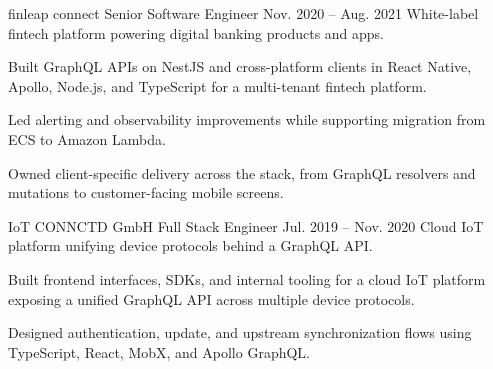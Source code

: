\ResumeJob
  {finleap connect}
  {Senior Software Engineer}
  {Nov. 2020 -- Aug. 2021}
  {White-label fintech platform powering digital banking products and apps.}
\begin{ResumeList}
  \item Built GraphQL APIs on NestJS and cross-platform clients in React Native, Apollo, Node.js, and TypeScript for a multi-tenant fintech platform.
  \item Led alerting and observability improvements while supporting migration from ECS to Amazon Lambda.
  \item Owned client-specific delivery across the stack, from GraphQL resolvers and mutations to customer-facing mobile screens.
\end{ResumeList}

\ResumeJob
  {IoT CONNCTD GmbH}
  {Full Stack Engineer}
  {Jul. 2019 -- Nov. 2020}
  {Cloud IoT platform unifying device protocols behind a GraphQL API.}
\begin{ResumeList}
  \item Built frontend interfaces, SDKs, and internal tooling for a cloud IoT platform exposing a unified GraphQL API across multiple device protocols.
  \item Designed authentication, update, and upstream synchronization flows using TypeScript, React, MobX, and Apollo GraphQL.
\end{ResumeList}

